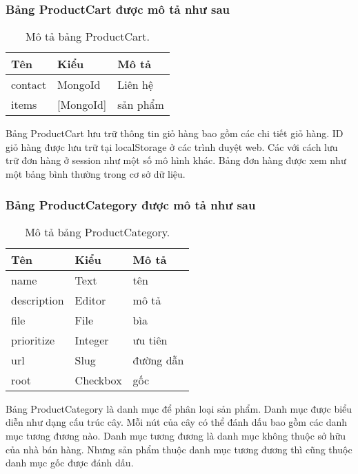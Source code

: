 \subsubsection{Bảng ProductCart được mô tả như sau}
\begin{table}[!htbp]\fontsize{13px}{13px}\selectfont\justifying
\begin{center}
\caption{Mô tả bảng ProductCart.}
\begin{tabularx}{0.6\textwidth}{ |l|l|X| } 
\hline
Tên & Kiểu & Mô tả \\

\hline
contact & MongoId & Liên hệ\\
items & [MongoId] & sản phẩm\\
\hline
\end{tabularx}
\label{table:ProductCart}
\end{center}
Bảng ProductCart lưu trữ thông tin giỏ hàng bao gồm các chi tiết giỏ hàng. ID giỏ hàng được lưu trữ tại localStorage ở các trình duyệt web. Các với cách lưu trữ đơn hàng ở session như một số mô hình khác. Bảng đơn hàng được xem như một bảng bình thường trong cơ sở dữ liệu.
\end{table}
\clearpage
\subsubsection{Bảng ProductCategory được mô tả như sau}
\begin{table}[!htbp]\fontsize{13px}{13px}\selectfont\justifying
\begin{center}
\caption{Mô tả bảng ProductCategory.}
\begin{tabularx}{0.6\textwidth}{ |l|l|X| } 
\hline
Tên & Kiểu & Mô tả \\
\hline
name & Text & tên \\
description & Editor & mô tả \\
file & File & bìa \\
prioritize & Integer & ưu tiên \\
url & Slug & đường dẫn \\
root & Checkbox & gốc \\
\hline
\end{tabularx}
\label{table:ProductCategory}
\end{center}
Bảng ProductCategory là danh mục để phân loại sản phẩm. Danh mục được biểu diễn như dạng cấu trúc cây. Mỗi nút của cây có thể đánh dấu bao gồm các danh mục tương đương nào. Danh mục tương đương là danh mục không thuộc sở hữu của nhà bán hàng. Nhưng sản phẩm thuộc danh mục tương đương thì cũng thuộc danh mục gốc được đánh dấu.
\end{table}

